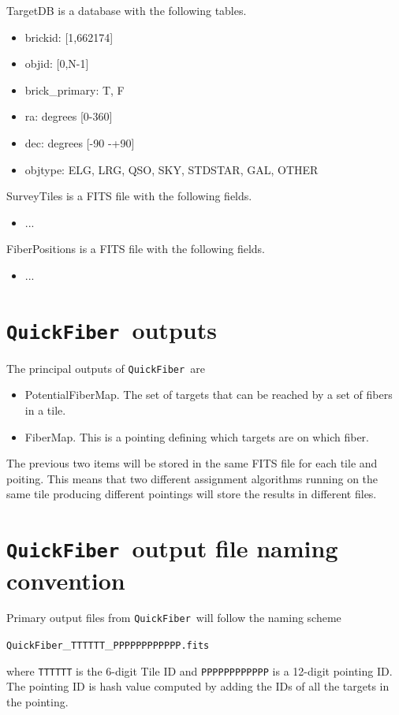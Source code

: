 \documentclass{article}
\newcommand{\code}{{\texttt{QuickFiber}}}
\begin{document}
TargetDB is a database with the following tables.
\begin{itemize}
\item brickid: [1,662174]
\item objid: [0,N-1]
\item brick\_primary: T, F
\item ra: degrees [0-360]
\item dec: degrees [-90 -+90]
\item objtype: ELG, LRG, QSO, SKY, STDSTAR, GAL, OTHER
\end{itemize}

\noindent
SurveyTiles is a FITS file with the following fields.
\begin{itemize}
\item ...
\end{itemize}

FiberPositions is a FITS file with the following fields.
\begin{itemize}
\item ...
\end{itemize}



\section{\code\ outputs}

The principal outputs of \code\ are
\begin{itemize}
\item PotentialFiberMap. The set of targets that can be reached by a
  set of fibers in a  tile.  
\item FiberMap. This is a pointing defining which targets are on which
  fiber.
\end{itemize}

The previous two items will be stored in the same FITS file for each
tile and poiting. This means that two different assignment algorithms
running on the same tile producing different pointings will store
the results in different files. 

\section{\code\ output file naming convention}

Primary output files from \code\ will follow the naming scheme

\begin{center}
\code\_{\texttt{TTTTTT}}\_{\texttt{PPPPPPPPPPPP.fits}}
\end{center}
\noindent
where \texttt{TTTTTT} is the 6-digit Tile ID and \texttt{PPPPPPPPPPPP} is
a 12-digit pointing ID. The pointing ID is hash value computed by
adding the IDs of all the targets in the pointing. 
\end{document}
